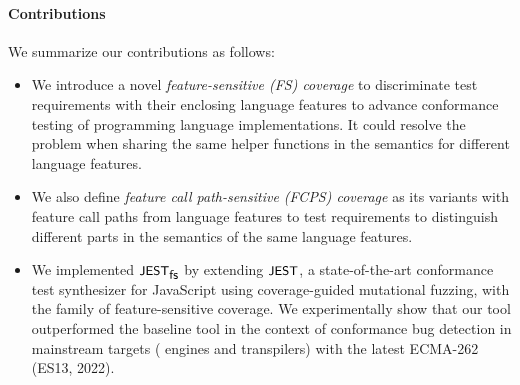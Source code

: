 \paragraph{\textbf{Contributions}}
%
We summarize our contributions as follows:
%
\begin{itemize}

  \item
    We introduce a novel \textit{feature-sensitive (FS) coverage} to discriminate
    test requirements with their enclosing language features to advance
    conformance testing of programming language implementations.
    It could resolve the problem when sharing the same helper
    functions in the semantics for different language features.
  \item 
    We also define \textit{feature call path-sensitive (FCPS) coverage} as its
    variants with feature call paths from language features to test requirements
    to distinguish different parts in the semantics of the same language
    features.

  \item
    We implemented $\textsf{\small JEST}_{\textsf{\small fs}}$ by extending $\textsf{\small JEST}$, a state-of-the-art conformance
    test synthesizer for JavaScript using coverage-guided mutational fuzzing,
    with the family of feature-sensitive coverage.
    We experimentally show that our tool outperformed the baseline tool in the
    context of conformance bug detection in  mainstream targets
    ( engines and  transpilers) with the latest ECMA-262
    (ES13, 2022).
\end{itemize}
